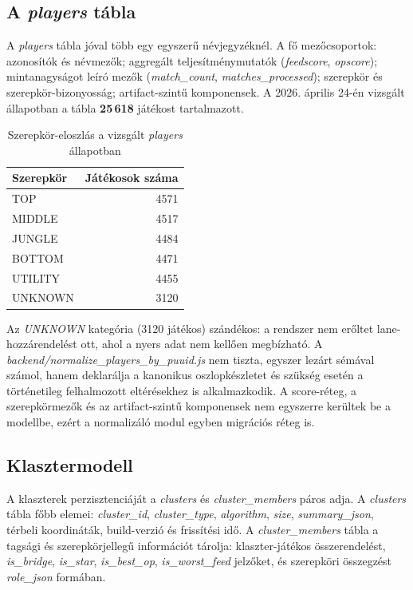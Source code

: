 \subsection{A \textit{players} tábla}

A \textit{players} tábla jóval több egy egyszerű névjegyzéknél. A fő mezőcsoportok: azonosítók és névmezők; aggregált teljesítménymutatók (\textit{feedscore}, \textit{opscore}); mintanagyságot leíró mezők (\textit{match\_count}, \textit{matches\_processed}); szerepkör és szerepkör-bizonyosság; artifact-szintű komponensek. A 2026. április 24-én vizsgált állapotban a tábla \textbf{25\,618} játékost tartalmazott.

\begin{table}[H]
\centering
\caption{Szerepkör-eloszlás a vizsgált \textit{players} állapotban}
\begin{tabular}{lr}
\toprule
\textbf{Szerepkör} & \textbf{Játékosok száma} \\
\midrule
TOP & 4571 \\
MIDDLE & 4517 \\
JUNGLE & 4484 \\
BOTTOM & 4471 \\
UTILITY & 4455 \\
UNKNOWN & 3120 \\
\bottomrule
\end{tabular}
\end{table}

Az \textit{UNKNOWN} kategória (3120 játékos) szándékos: a rendszer nem erőltet lane-hozzárendelést ott, ahol a nyers adat nem kellően megbízható. A \textit{backend/normalize\_players\_by\_puuid.js} nem tiszta, egyszer lezárt sémával számol, hanem deklarálja a kanonikus oszlopkészletet és szükség esetén a történetileg felhalmozott eltérésekhez is alkalmazkodik. A score-réteg, a szerepkörmezők és az artifact-szintű komponensek nem egyszerre kerültek be a modellbe, ezért a normalizáló modul egyben migrációs réteg is.

\subsection{Klasztermodell}

A klaszterek perzisztenciáját a \textit{clusters} és \textit{cluster\_members} páros adja. A \textit{clusters} tábla főbb elemei: \textit{cluster\_id}, \textit{cluster\_type}, \textit{algorithm}, \textit{size}, \textit{summary\_json}, térbeli koordináták, build-verzió és frissítési idő. A \textit{cluster\_members} tábla a tagsági és szerepkörjellegű információt tárolja: klaszter-játékos összerendelést, \textit{is\_bridge}, \textit{is\_star}, \textit{is\_best\_op}, \textit{is\_worst\_feed} jelzőket, és szerepköri összegzést \textit{role\_json} formában.

